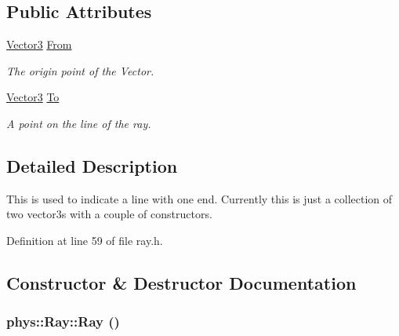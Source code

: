 \subsection*{Public Attributes}
\begin{DoxyCompactItemize}
\item 
\hypertarget{classphys_1_1Ray_a3004d52f8f1e317ee602f8f278531057}{
\hyperlink{classphys_1_1Vector3}{Vector3} \hyperlink{classphys_1_1Ray_a3004d52f8f1e317ee602f8f278531057}{From}}
\label{df/d57/classphys_1_1Ray_a3004d52f8f1e317ee602f8f278531057}

\begin{DoxyCompactList}\small\item\em The origin point of the Vector. \item\end{DoxyCompactList}\item 
\hypertarget{classphys_1_1Ray_aa2585a1c6d29d1533c816e7277baf1ad}{
\hyperlink{classphys_1_1Vector3}{Vector3} \hyperlink{classphys_1_1Ray_aa2585a1c6d29d1533c816e7277baf1ad}{To}}
\label{df/d57/classphys_1_1Ray_aa2585a1c6d29d1533c816e7277baf1ad}

\begin{DoxyCompactList}\small\item\em A point on the line of the ray. \item\end{DoxyCompactList}\end{DoxyCompactItemize}


\subsection{Detailed Description}
This is used to indicate a line with one end. Currently this is just a collection of two vector3s with a couple of constructors. 

Definition at line 59 of file ray.h.



\subsection{Constructor \& Destructor Documentation}
\hypertarget{classphys_1_1Ray_a35f4f5eec653ea561353163eaad672d3}{
\subsubsection[{Ray}]{\setlength{\rightskip}{0pt plus 5cm}phys::Ray::Ray ()}}
\label{df/d57/classphys_1_1Ray_a35f4f5eec653ea561353163eaad672d3}


